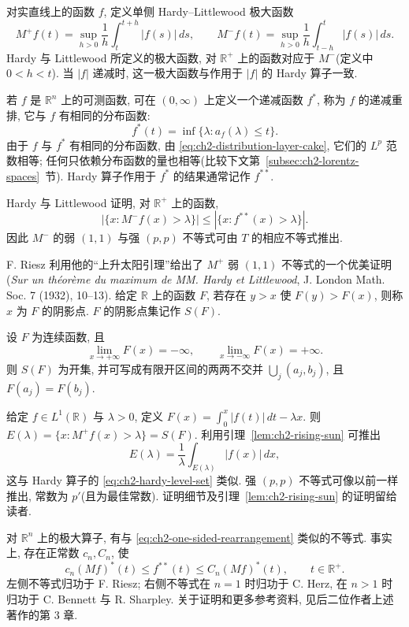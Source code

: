 \hypertarget{chapter-02-page-052}{}
对实直线上的函数 $f$, 定义单侧 Hardy--Littlewood 极大函数
\[
 M^+f(t)=\sup_{h>0}\frac1h\int_t^{t+h}|f(s)|\,ds,
 \qquad
 M^-f(t)=\sup_{h>0}\frac1h\int_{t-h}^{t}|f(s)|\,ds.
\]
Hardy 与 Littlewood 所定义的极大函数, 对 $\mathbb R^+$ 上的函数对应于 $M^-$(定义中 $0<h<t$). 当 $|f|$ 递减时, 这一极大函数与作用于 $|f|$ 的 Hardy 算子一致.

若 $f$ 是 $\mathbb R^n$ 上的可测函数, 可在 $(0,\infty)$ 上定义一个递减函数 $f^*$, 称为 $f$ 的递减重排, 它与 $f$ 有相同的分布函数:
\[
 f^*(t)=\inf\{\lambda:a_f(\lambda)\le t\}.
\]
由于 $f$ 与 $f^*$ 有相同的分布函数, 由 \eqref{eq:ch2-distribution-layer-cake}, 它们的 $L^p$ 范数相等; 任何只依赖分布函数的量也相等(比较下文第~\ref{subsec:ch2-lorentz-spaces}~节). Hardy 算子作用于 $f^*$ 的结果通常记作 $f^{**}$.

Hardy 与 Littlewood 证明, 对 $\mathbb R^+$ 上的函数,
\begin{equation}
\label{eq:ch2-one-sided-rearrangement}
 |\{x:M^-f(x)>\lambda\}|\le |\{x:f^{**}(x)>\lambda\}|.
\end{equation}
因此 $M^-$ 的弱 $(1,1)$ 与强 $(p,p)$ 不等式可由 $T$ 的相应不等式推出.

F. Riesz 利用他的“上升太阳引理”给出了 $M^+$ 弱 $(1,1)$ 不等式的一个优美证明(\emph{Sur un théorème du maximum de MM. Hardy et Littlewood}, J. London Math. Soc. 7 (1932), 10--13). 给定 $\mathbb R$ 上的函数 $F$, 若存在 $y>x$ 使 $F(y)>F(x)$, 则称 $x$ 为 $F$ 的阴影点. $F$ 的阴影点集记作 $S(F)$.

\begin{Lemma}
\label{lem:ch2-rising-sun}
设 $F$ 为连续函数, 且
\[
 \lim_{x\to+\infty}F(x)=-\infty,
 \qquad
 \lim_{x\to-\infty}F(x)=+\infty.
\]
则 $S(F)$ 为开集, 并可写成有限开区间的两两不交并 $\bigcup_j(a_j,b_j)$, 且 $F(a_j)=F(b_j)$.
\end{Lemma}

给定 $f\in L^1(\mathbb R)$ 与 $\lambda>0$, 定义 $F(x)=\int_0^x|f(t)|\,dt-\lambda x$. 则 $E(\lambda)=\{x:M^+f(x)>\lambda\}=S(F)$. 利用引理~\ref{lem:ch2-rising-sun} 可推出
\[
 E(\lambda)=\frac1\lambda\int_{E(\lambda)}|f(x)|\,dx,
\]
这与 Hardy 算子的 \eqref{eq:ch2-hardy-level-set} 类似. 强 $(p,p)$ 不等式可像以前一样推出, 常数为 $p'$(且为最佳常数). 证明细节及引理~\ref{lem:ch2-rising-sun} 的证明留给读者.

\hypertarget{chapter-02-page-053}{}
对 $\mathbb R^n$ 上的极大算子, 有与 \eqref{eq:ch2-one-sided-rearrangement} 类似的不等式. 事实上, 存在正常数 $c_n,C_n$, 使
\[
 c_n(Mf)^*(t)\le f^{**}(t)\le C_n(Mf)^*(t),
 \qquad t\in\mathbb R^+.
\]
左侧不等式归功于 F. Riesz; 右侧不等式在 $n=1$ 时归功于 C. Herz, 在 $n>1$ 时归功于 C. Bennett 与 R. Sharpley. 关于证明和更多参考资料, 见后二位作者上述著作的第 3 章.

